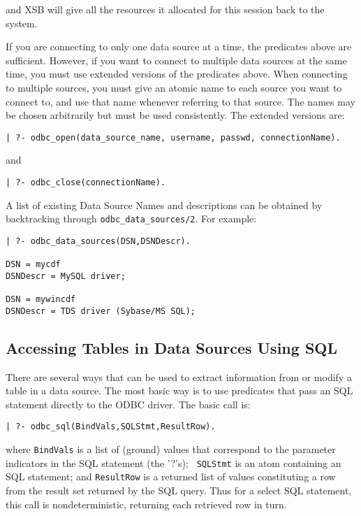 and XSB will give all the resources it allocated for this session back
to the system.

If you are connecting to only one data source at a time, the
predicates above are sufficient.  However, if you want to connect to
multiple data sources at the same time, you must use extended versions
of the predicates above.  When connecting to multiple sources, you
must give an atomic name to each source you want to connect to, and
use that name whenever referring to that source.  The names may be
chosen arbitrarily but must be used consistently.  The extended
versions are:

\begin{verbatim}
| ?- odbc_open(data_source_name, username, passwd, connectionName).
\end{verbatim}

and

\begin{verbatim}
| ?- odbc_close(connectionName).
\end{verbatim}

A list of existing Data Source Names and descriptions can be obtained
by backtracking through \texttt{odbc\_data\_sources/2}. For example:

\begin{verbatim}
| ?- odbc_data_sources(DSN,DSNDescr).
 
DSN = mycdf
DSNDescr = MySQL driver;
 
DSN = mywincdf
DSNDescr = TDS driver (Sybase/MS SQL);
\end{verbatim}

\subsection{Accessing Tables in Data Sources Using SQL}

There are several ways that can be used to extract information from or
modify a table in a data source.  The most basic way is to use
predicates that pass an SQL statement directly to the ODBC driver.
The basic call is:

\begin{verbatim}
| ?- odbc_sql(BindVals,SQLStmt,ResultRow).
\end{verbatim}
\noindent
where {\tt BindVals} is a list of (ground) values that correspond to
the parameter indicators in the SQL statement (the '?'s); {\tt
SQLStmt} is an atom containing an SQL statement; and {\tt ResultRow}
is a returned list of values constituting a row from the result set
returned by the SQL query.  Thus for a select SQL statement, this call
is nondeterministic, returning each retrieved row in turn.

